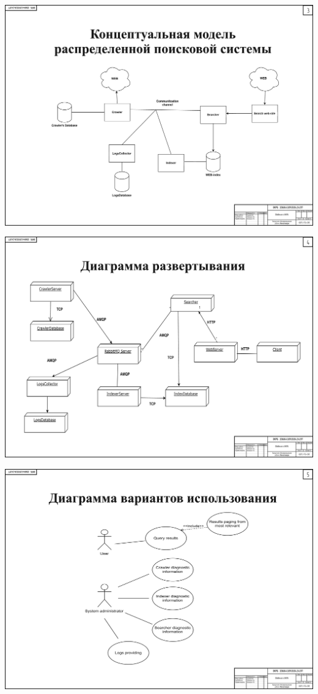 \begin{landscape}
\begin{плакат}
    \includegraphics[width=0.82\linewidth]{posters/p3im.png}
    \label{p3im:image}      
\end{плакат}

\begin{плакат}
    \includegraphics[width=0.82\linewidth]{posters/p4im.png}
    \label{p4im:image}      
\end{плакат}

\begin{плакат}
    \includegraphics[width=0.82\linewidth]{posters/p5im.png}
    \label{p5im:image}      
\end{плакат}


\end{landscape}
